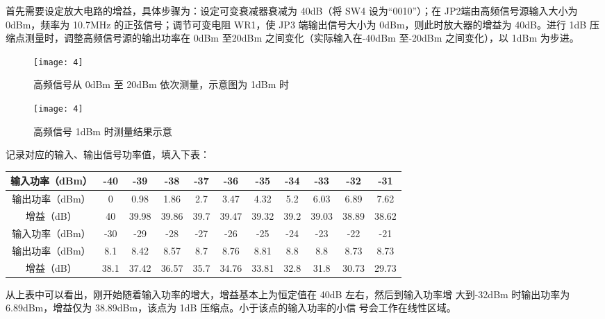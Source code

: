 \documentclass{../source/Experiment}
\begin{document}
            首先需要设定放大电路的增益，具体步骤为：设定可变衰减器衰减为 40dB（将 SW4 设为“0010”）；在 JP2端由高频信号源输入大小为 0dBm，频率为 10.7MHz 的正弦信号；调节可变电阻 WR1，使 JP3 端输出信号大小为 0dBm，则此时放大器的增益为 40dB。进行 1dB 压缩点测量时，调整高频信号源的输出功率在 0dBm 至20dBm 之间变化（实际输入在-40dBm 至-20dBm 之间变化），以 1dBm 为步进。

            \begin{figure}[H]
                \centering
                \texttt{[image: 4]}
                \caption{高频信号从 0dBm 至 20dBm 依次测量，示意图为 1dBm 时}
            \end{figure}

            \begin{figure}[H]
                \centering
                \texttt{[image: 4]}
                \caption{高频信号 1dBm 时测量结果示意}
            \end{figure}

            记录对应的输入、输出信号功率值，填入下表：

            \begin{table}[H]
                \begin{tabular}{|c|c|c|c|c|c|c|c|c|c|c|}
                \hline
                输入功率（dBm） & -40  & -39   & -38   & -37  & -36   & -35   & -34  & -33   & -32   & -31   \\ \hline
                输出功率（dBm） & 0    & 0.98  & 1.86  & 2.7  & 3.47  & 4.32  & 5.2  & 6.03  & 6.89  & 7.62  \\ \hline
                增益（dB）    & 40   & 39.98 & 39.86 & 39.7 & 39.47 & 39.32 & 39.2 & 39.03 & 38.89 & 38.62 \\ \hline
                输入功率（dBm） & -30  & -29   & -28   & -27  & -26   & -25   & -24  & -23   & -22   & -21   \\ \hline
                输出功率（dBm） & 8.1  & 8.42  & 8.57  & 8.7  & 8.76  & 8.81  & 8.8  & 8.8   & 8.73  & 8.73  \\ \hline
                增益（dB）    & 38.1 & 37.42 & 36.57 & 35.7 & 34.76 & 33.81 & 32.8 & 31.8  & 30.73 & 29.73 \\ \hline
                \end{tabular}
                \end{table}

            从上表中可以看出，刚开始随着输入功率的增大，增益基本上为恒定值在 40dB 左右，然后到输入功率增
            大到-32dBm 时输出功率为 6.89dBm，增益仅为 38.89dBm，该点为 1dB 压缩点。小于该点的输入功率的小信
            号会工作在线性区域。
\end{document}
